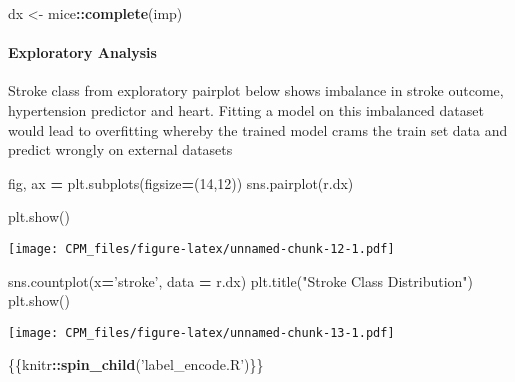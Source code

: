 \documentclass[]{article}
\newenvironment{Shaded}{\begin{snugshade}}{\end{snugshade}}
\newcommand{\DecValTok}[1]{\textcolor[rgb]{0.00,0.00,0.81}{#1}}
\newcommand{\KeywordTok}[1]{\textcolor[rgb]{0.13,0.29,0.53}{\textbf{#1}}}
\newcommand{\NormalTok}[1]{#1}
\newcommand{\OperatorTok}[1]{\textcolor[rgb]{0.81,0.36,0.00}{\textbf{#1}}}
\newcommand{\StringTok}[1]{\textcolor[rgb]{0.31,0.60,0.02}{#1}}
\let\oldparagraph\paragraph
\renewcommand{\paragraph}[1]{\oldparagraph{#1}\mbox{}}
\begin{document}
\begin{Shaded}
\begin{Highlighting}[]
\NormalTok{dx <-}\StringTok{ }\NormalTok{mice}\OperatorTok{::}\KeywordTok{complete}\NormalTok{(imp)}
\end{Highlighting}
\end{Shaded}

\hypertarget{exploratory-analysis}{%
\paragraph{Exploratory Analysis}\label{exploratory-analysis}}

Stroke class from exploratory pairplot below shows imbalance in stroke
outcome, hypertension predictor and heart. Fitting a model on this
imbalanced dataset would lead to overfitting whereby the trained model
crams the train set data and predict wrongly on external datasets

\begin{Shaded}
\begin{Highlighting}[]
\NormalTok{fig, ax }\OperatorTok{=}\NormalTok{ plt.subplots(figsize}\OperatorTok{=}\NormalTok{(}\DecValTok{14}\NormalTok{,}\DecValTok{12}\NormalTok{))}
\NormalTok{sns.pairplot(r.dx)}
\end{Highlighting}
\end{Shaded}

\begin{Shaded}
\begin{Highlighting}[]
\NormalTok{plt.show()}
\end{Highlighting}
\end{Shaded}

\texttt{[image: CPM\_files/figure-latex/unnamed-chunk-12-1.pdf]}

\begin{Shaded}
\begin{Highlighting}[]
\NormalTok{sns.countplot(x}\OperatorTok{=}\StringTok{'stroke'}\NormalTok{, data }\OperatorTok{=}\NormalTok{ r.dx)}
\NormalTok{plt.title(}\StringTok{"Stroke Class Distribution"}\NormalTok{)}
\NormalTok{plt.show()}
\end{Highlighting}
\end{Shaded}

\texttt{[image: CPM\_files/figure-latex/unnamed-chunk-13-1.pdf]}

\begin{Shaded}
\begin{Highlighting}[]
\NormalTok{\{\{knitr}\OperatorTok{::}\KeywordTok{spin_child}\NormalTok{(}\StringTok{'label_encode.R'}\NormalTok{)\}\}}
\end{Highlighting}
\end{Shaded}
\end{document}
